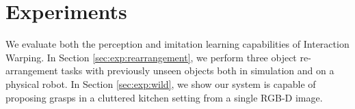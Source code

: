 \documentclass{article}
\newcommand{\evdp}[1]{\textcolor{blue}{[\textbf{EvdP:} #1]}}
\newcommand{\rob}[1]{\textcolor{green}{[\textbf{rob:} #1]}}
\begin{document}




\section{Experiments}
\label{sec:exp}

We evaluate both the perception and imitation learning capabilities of Interaction Warping. In Section \ref{sec:exp:rearrangement}, we perform three object re-arrangement tasks with previously unseen objects both in simulation and on a physical robot. In Section \ref{sec:exp:wild}, we show our system is capable of proposing grasps in a cluttered kitchen setting from a single RGB-D image.
\end{document}
